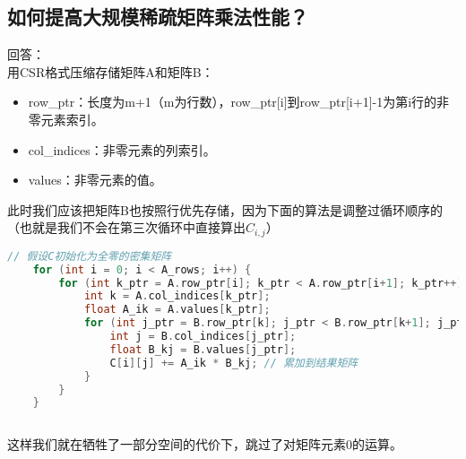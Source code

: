 \documentclass{SYSUReport}
\begin{document}
\subsection{如何提高大规模稀疏矩阵乘法性能？}

    回答：\\
    用CSR格式压缩存储矩阵A和矩阵B：
    \begin{itemize}
        \item row\_ptr：长度为m+1（m为行数），row\_ptr[i]到row\_ptr[i+1]-1为第i行的非零元素索引。
        \item col\_indices：非零元素的列索引。
        \item values：非零元素的值。
    \end{itemize}
    此时我们应该把矩阵B也按照行优先存储，因为下面的算法是调整过循环顺序的（也就是我们不会在第三次循环中直接算出$C_{i,j}$）

    \begin{lstlisting}[language=c++]
        // 假设C初始化为全零的密集矩阵
    for (int i = 0; i < A_rows; i++) {
        for (int k_ptr = A.row_ptr[i]; k_ptr < A.row_ptr[i+1]; k_ptr++) {
            int k = A.col_indices[k_ptr];
            float A_ik = A.values[k_ptr];
            for (int j_ptr = B.row_ptr[k]; j_ptr < B.row_ptr[k+1]; j_ptr++) {
                int j = B.col_indices[j_ptr];
                float B_kj = B.values[j_ptr];
                C[i][j] += A_ik * B_kj; // 累加到结果矩阵
            }
        }
    }
    
    \end{lstlisting}
    这样我们就在牺牲了一部分空间的代价下，跳过了对矩阵元素0的运算。
\end{document}

